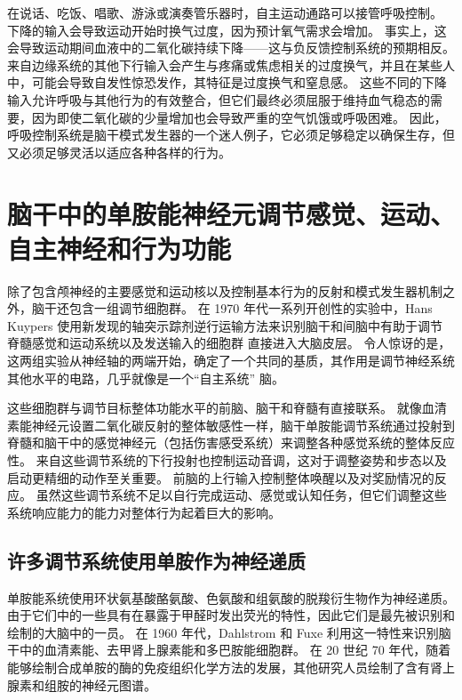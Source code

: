 在说话、吃饭、唱歌、游泳或演奏管乐器时，自主运动通路可以接管呼吸控制。
下降的输入会导致运动开始时换气过度，因为预计氧气需求会增加。
事实上，这会导致运动期间血液中的二氧化碳持续下降——这与负反馈控制系统的预期相反。
来自边缘系统的其他下行输入会产生与疼痛或焦虑相关的过度换气，并且在某些人中，可能会导致自发性惊恐发作，其特征是过度换气和窒息感。
这些不同的下降输入允许呼吸与其他行为的有效整合，但它们最终必须屈服于维持血气稳态的需要，因为即使二氧化碳的少量增加也会导致严重的空气饥饿或呼吸困难。
因此，呼吸控制系统是脑干模式发生器的一个迷人例子，它必须足够稳定以确保生存，但又必须足够灵活以适应各种各样的行为。



\section{脑干中的单胺能神经元调节感觉、运动、自主神经和行为功能}

除了包含颅神经的主要感觉和运动核以及控制基本行为的反射和模式发生器机制之外，脑干还包含一组调节细胞群。
在 1970 年代一系列开创性的实验中，Hans Kuypers 使用新发现的轴突示踪剂逆行运输方法来识别脑干和间脑中有助于调节脊髓感觉和运动系统以及发送输入的细胞群 直接进入大脑皮层。
令人惊讶的是，这两组实验从神经轴的两端开始，确定了一个共同的基质，其作用是调节神经系统其他水平的电路，几乎就像是一个“自主系统” 脑。


这些细胞群与调节目标整体功能水平的前脑、脑干和脊髓有直接联系。
就像血清素能神经元设置二氧化碳反射的整体敏感性一样，脑干单胺能调节系统通过投射到脊髓和脑干中的感觉神经元（包括伤害感受系统）来调整各种感觉系统的整体反应性。
来自这些调节系统的下行投射也控制运动音调，这对于调整姿势和步态以及启动更精细的动作至关重要。
前脑的上行输入控制整体唤醒以及对奖励情况的反应。
虽然这些调节系统不足以自行完成运动、感觉或认知任务，但它们调整这些系统响应能力的能力对整体行为起着巨大的影响。



\subsection{许多调节系统使用单胺作为神经递质}

单胺能系统使用环状氨基酸酪氨酸、色氨酸和组氨酸的脱羧衍生物作为神经递质。
由于它们中的一些具有在暴露于甲醛时发出荧光的特性，因此它们是最先被识别和绘制的大脑中的一员。
在 1960 年代，Dahlstrom 和 Fuxe 利用这一特性来识别脑干中的血清素能、去甲肾上腺素能和多巴胺能细胞群。
在 20 世纪 70 年代，随着能够绘制合成单胺的酶的免疫组织化学方法的发展，其他研究人员绘制了含有肾上腺素和组胺的神经元图谱。


